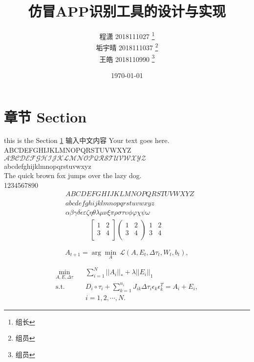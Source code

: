 \documentclass[UTF8,a4paper,10pt, twocolumn]{ctexart}
\title{仿冒APP识别工具的设计与实现}
\author{ 程潇 2018111027  \thanks{组长}\\
垢宇晴 2018111037  \thanks{组员}\\
王皓 2018110990  \thanks{组员}
}
\date{\today}
\begin{document}
    \maketitle
    \thispagestyle{fancy}

\section{章节 Section} \label{sec:one}
    this is the Section \ref{sec:one}
    输入中文内容 Your text goes here. \\
    ABCDEFGHIJKLMNOPQRSTUVWXYZ \\
    $\mathcal{ABCDEFGHIJKLMNOPQRSTUVWXYZ}$ \\
    abcdefghijklmnopqrstuvwxyz \\
    The quick brown fox jumps over the lazy dog.\\
    1234567890
    \begin{align}
		& ABCDEFGHIJKLMNOPQRSTUVWXYZ \label{eq:alphabet} \\
		& abcdefghijklmnopqrstuvwxyz \\
	& \alpha \beta \gamma \delta \epsilon \varepsilon \zeta \eta \theta \lambda \mu \nu \xi \pi \rho \sigma \tau \upsilon \phi \varphi \chi \psi \omega
	\end{align}
    \begin{align}
	 \begin{bmatrix}
		1 & 2 \\
		3 & 4 \\
	\end{bmatrix}
	 \begin{pmatrix}
	1 & 2 \\
	3 & 4 \\
	\end{pmatrix}
	 \begin{matrix}
	1 & 2 \\
	3 & 4 \\
	\end{matrix}
	\end{align}

    \begin{equation}
	A_{t+1} = \arg\min_A \ \mathcal{L}(A,E_t,\Delta\tau_t,W_t,b_t), \nonumber
	\end{equation}

    \begin{equation}
	\begin{aligned} \label{eq:rasl}
	\min_{A,E,\Delta \tau} \quad & \sum_{i=1}^{N}||A_i||_* + \lambda ||E_i||_1  \\
	\mathrm{s.t.} \quad & D_i \circ \tau_i + \sum_{k=1}^{n_i} J_{ik} \Delta \tau_i \epsilon_k \epsilon_k^T = A_i + E_i, \\
	& i = 1,2,\cdots,N.
	\end{aligned}
	\end{equation}
\end{document}
